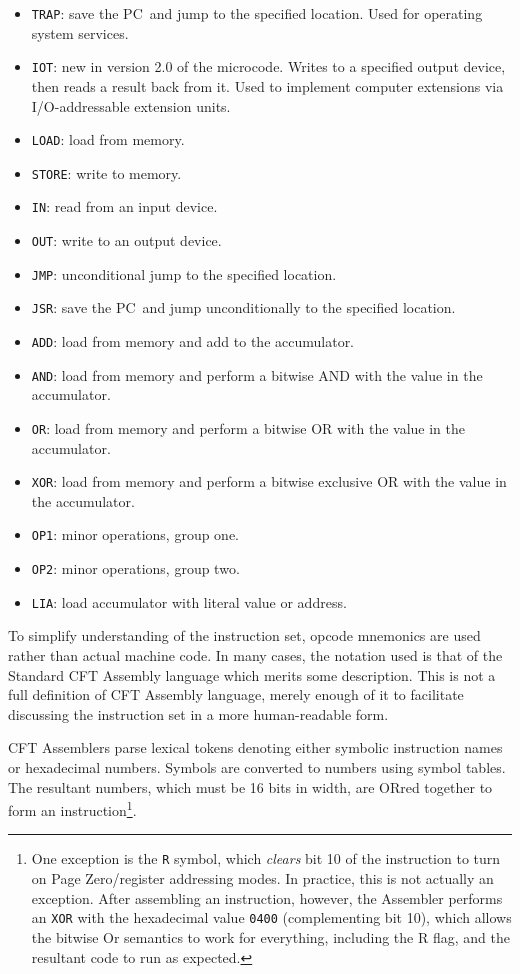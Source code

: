 \documentclass[11pt,a4paper,twocolumns]{article}
\newcommand\register[1]{\textsf{#1}}
\newcommand\PC{\register{PC}}
\begin{document}
\begin{itemize}
\item {\tt TRAP}: save the \PC\ and jump to the specified location. Used for operating system services.
\item {\tt IOT}: new in version 2.0 of the microcode. Writes to a specified output device, then reads a result back from it. Used to implement computer extensions via I/O-addressable extension units.
\item {\tt LOAD}: load from memory.
\item {\tt STORE}: write to memory.
\item {\tt IN}: read from an input device.
\item {\tt OUT}: write to an output device.
\item {\tt JMP}: unconditional jump to the specified location.
\item {\tt JSR}: save the \PC\ and jump unconditionally to the specified location.
\item {\tt ADD}: load from memory and add to the accumulator.
\item {\tt AND}: load from memory and perform a bitwise AND with the value in the accumulator.
\item {\tt OR}: load from memory and perform a bitwise OR with the value in the accumulator.
\item {\tt XOR}: load from memory and perform a bitwise exclusive OR with the value in the accumulator.
\item {\tt OP1}: minor operations, group one.
\item {\tt OP2}: minor operations, group two.
\item {\tt LIA}: load accumulator with literal value or address.
\end{itemize}

To simplify understanding of the instruction set, opcode mnemonics are
used rather than actual machine code. In many cases, the notation used
is that of the Standard CFT Assembly language which merits some
description. This is not a full definition of CFT Assembly language,
merely enough of it to facilitate discussing the instruction set in
a more human-readable form.

CFT Assemblers parse lexical tokens denoting either symbolic
instruction names or hexadecimal numbers. Symbols are converted to
numbers using symbol tables. The resultant numbers, which must be 16
bits in width, are ORred together to form an instruction\footnote{One
  exception is the {\tt R} symbol, which {\em clears\/} bit 10 of the
  instruction to turn on Page Zero/register addressing modes. In
  practice, this is not actually an exception. After assembling an
  instruction, however, the Assembler performs an {\tt XOR} with the
  hexadecimal value {\tt 0400} (complementing bit 10), which allows
  the bitwise Or semantics to work for everything, including the R
  flag, and the resultant code to run as expected.}.
\end{document}
